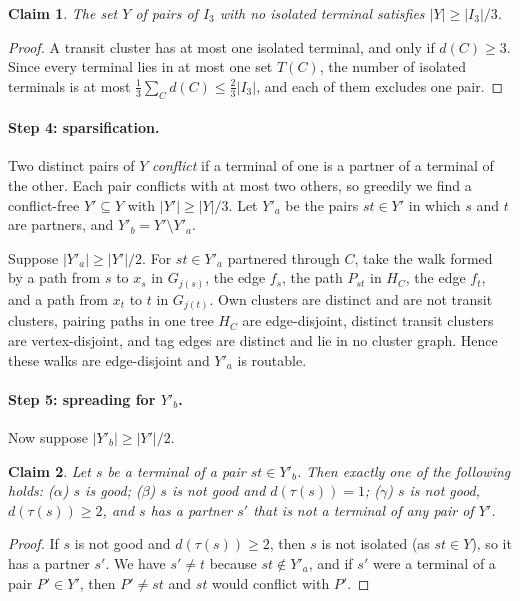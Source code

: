 \documentclass[11pt,letterpaper]{article}
\newtheorem{claim}{Claim}
\theoremstyle{definition}
\begin{document}
\begin{claim}\label{cl:Y}
The set $Y$ of pairs of $I_3$ with no isolated terminal satisfies $|Y|\ge|I_3|/3$.
\end{claim}
\begin{proof}
A transit cluster has at most one isolated terminal, and only if $d(C)\ge3$. Since every
terminal lies in at most one set $T(C)$, the number of isolated terminals is at most
$\frac13\sum_Cd(C)\le\frac23|I_3|$, and each of them excludes one pair.
\end{proof}

\paragraph{Step 4: sparsification.}
Two distinct pairs of $Y$ \emph{conflict} if a terminal of one is a partner of a terminal of
the other. Each pair conflicts with at most two others, so greedily we find a conflict-free
$Y'\subseteq Y$ with $|Y'|\ge|Y|/3$. Let $Y'_a$ be the pairs $st\in Y'$ in which $s$ and $t$
are partners, and $Y'_b=Y'\setminus Y'_a$.

Suppose $|Y'_a|\ge|Y'|/2$. For $st\in Y'_a$ partnered through $C$, take the walk formed by a
path from $s$ to $x_s$ in $G_{j(s)}$, the edge $f_s$, the path $P_{st}$ in $H_C$, the edge
$f_t$, and a path from $x_t$ to $t$ in $G_{j(t)}$. Own clusters are distinct and are not
transit clusters, pairing paths in one tree $H_C$ are edge-disjoint, distinct transit clusters
are vertex-disjoint, and tag edges are distinct and lie in no cluster graph. Hence these walks
are edge-disjoint and $Y'_a$ is routable.

\paragraph{Step 5: spreading for $Y'_b$.}
Now suppose $|Y'_b|\ge|Y'|/2$.

\begin{claim}\label{cl:cases}
Let $s$ be a terminal of a pair $st\in Y'_b$. Then exactly one of the following holds:
($\alpha$) $s$ is good; ($\beta$) $s$ is not good and $d(\tau(s))=1$; ($\gamma$) $s$ is not
good, $d(\tau(s))\ge2$, and $s$ has a partner $s'$ that is not a terminal of any pair of $Y'$.
\end{claim}
\begin{proof}
If $s$ is not good and $d(\tau(s))\ge2$, then $s$ is not isolated (as $st\in Y$), so it has a
partner $s'$. We have $s'\ne t$ because $st\notin Y'_a$, and if $s'$ were a terminal of a pair
$P'\in Y'$, then $P'\ne st$ and $st$ would conflict with $P'$.
\end{proof}
\end{document}
